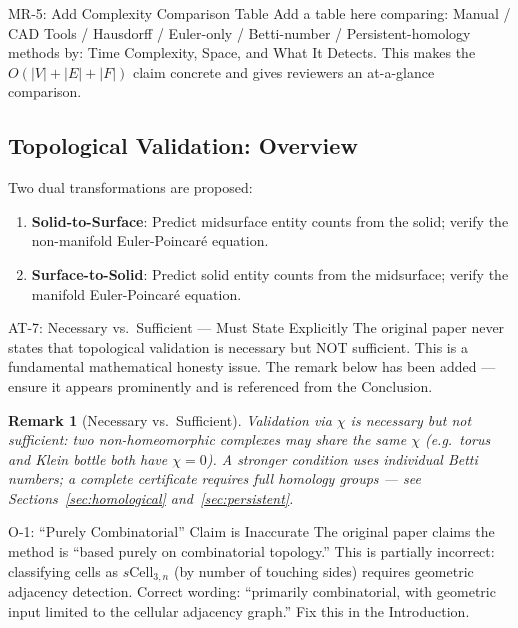 \documentclass[journal,twocolumn,10pt]{IEEEtran}
\newtheorem{remark}[theorem]{Remark}
\newcommand{\Euler}{\chi}
\newcommand{\sCell}[2]{s\text{Cell}_{#1,#2}}
\begin{document}
\begin{addblock}{MR-5: Add Complexity Comparison Table}
Add a table here comparing: Manual / CAD Tools / Hausdorff / Euler-only /
Betti-number / Persistent-homology methods by: Time Complexity, Space, and
What It Detects. This makes the $O(|V|+|E|+|F|)$ claim concrete and gives
reviewers an at-a-glance comparison.
\end{addblock}

\subsection{Topological Validation: Overview}

Two dual transformations are proposed:
\begin{enumerate}[noitemsep,topsep=2pt]
\item \textbf{Solid-to-Surface}: Predict midsurface entity counts from the
      solid; verify the non-manifold Euler-Poincar\'e equation.
\item \textbf{Surface-to-Solid}: Predict solid entity counts from the
      midsurface; verify the manifold Euler-Poincar\'e equation.
\end{enumerate}

\begin{atblock}{AT-7: Necessary vs.\ Sufficient --- Must State Explicitly}
The original paper never states that topological validation is necessary but
NOT sufficient. This is a fundamental mathematical honesty issue. The remark
below has been added --- ensure it appears prominently and is referenced from
the Conclusion.
\end{atblock}

\begin{remark}[Necessary vs.\ Sufficient]\label{rem:nec-suf}
Validation via $\Euler$ is \emph{necessary} but not \emph{sufficient}: two
non-homeomorphic complexes may share the same $\Euler$ (e.g.\ torus and Klein
bottle both have $\Euler=0$). A stronger condition uses individual Betti
numbers; a complete certificate requires full homology groups --- see
Sections~\ref{sec:homological} and~\ref{sec:persistent}.
\end{remark}

\begin{oblock}{O-1: ``Purely Combinatorial'' Claim is Inaccurate}
The original paper claims the method is ``based purely on combinatorial
topology.'' This is partially incorrect: classifying cells as
$\sCell{3}{n}$ (by number of touching sides) requires geometric adjacency
detection. Correct wording: ``primarily combinatorial, with geometric input
limited to the cellular adjacency graph.'' Fix this in the Introduction.
\end{oblock}
\end{document}
